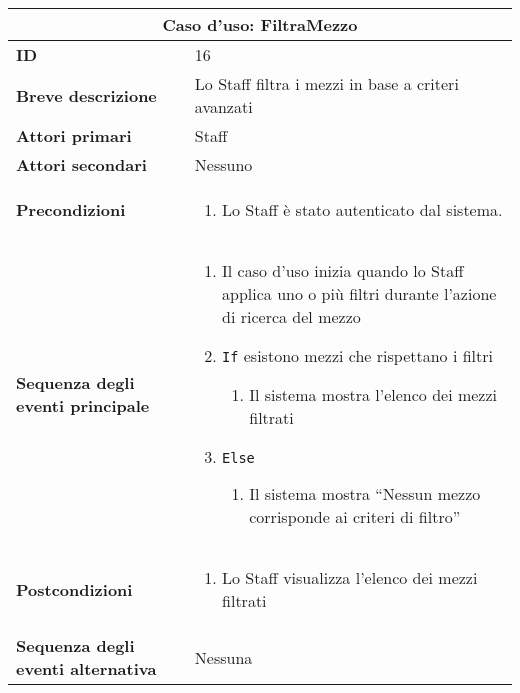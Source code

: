 \documentclass[a4paper]{report}
\begin{document}
\clearpage
\begin{table}[H]
\vspace*{-0cm}
\renewcommand{\arraystretch}{1.9}
\begin{tabular}{|p{3.9cm}|p{9.9cm}|}
\hline
\multicolumn{2}{|c|}{\textbf{Caso d’uso: FiltraMezzo}} \\ \hline
	\textbf{ID} & 16 \\ \hline
	\textbf{Breve descrizione} & Lo Staff filtra i mezzi in base a criteri avanzati  \\ \hline
	\textbf{Attori primari} & Staff \\ \hline
	\textbf{Attori secondari} & Nessuno \\ \hline
	\textbf{Precondizioni} & \begin{enumerate}[label=\arabic*.,leftmargin=14pt,labelsep=0.5em,topsep=0pt,partopsep=0pt,parsep=0pt,itemsep=0pt]
        \item Lo Staff è stato autenticato dal sistema.
    \end{enumerate} \\ \hline
	\textbf{Sequenza degli eventi principale} & 
\begin{enumerate}[leftmargin=14pt,label=\arabic*.,labelsep=0.5em,topsep=0pt,partopsep=0pt,parsep=0pt,itemsep=0pt]
    \item Il caso d'uso inizia quando lo Staff applica uno o più filtri durante l'azione di ricerca del mezzo 
    \item \texttt{If} esistono mezzi che rispettano i filtri
    \begin{enumerate}[label=\arabic{enumi}.\arabic*.,leftmargin=22pt,labelsep=0.5em,topsep=0pt,partopsep=0pt,parsep=0pt,itemsep=0pt]
        \item Il sistema mostra l’elenco dei mezzi filtrati
    \end{enumerate}
    \item \texttt{Else}
    \begin{enumerate}[label=\arabic{enumi}.\arabic*.,leftmargin=22pt,labelsep=0.5em,topsep=0pt,partopsep=0pt,parsep=0pt,itemsep=0pt]
        \item Il sistema mostra “Nessun mezzo corrisponde ai criteri di filtro”
    \end{enumerate}
\end{enumerate}\\ \hline
    	\textbf{Postcondizioni} & \begin{enumerate}[label=\arabic*.,leftmargin=14pt,labelsep=0.5em,topsep=0pt,partopsep=0pt,parsep=0pt,itemsep=0pt]
        \item Lo Staff visualizza l’elenco dei mezzi filtrati
        \end{enumerate} \\ \hline
    	\textbf{Sequenza degli eventi alternativa} & Nessuna \\ \hline
\end{tabular}
\end{table}
\end{document}

